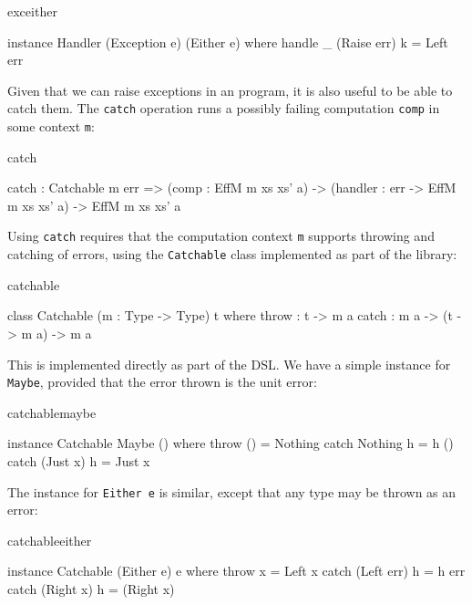 \begin{SaveVerbatim}{exceither}

instance Handler (Exception e) (Either e) where
     handle _ (Raise err) k = Left err

\end{SaveVerbatim}

\noindent
Given that we can raise exceptions in an \Eff{} program, it is also useful to be
able to catch them. The \texttt{catch} operation runs a possibly failing
computation \texttt{comp} in some context \texttt{m}:

\begin{SaveVerbatim}{catch}

catch : Catchable m err =>
        (comp : EffM m xs xs' a) -> 
        (handler : err -> EffM m xs xs' a) ->
        EffM m xs xs' a

\end{SaveVerbatim}

\noindent
Using \texttt{catch} requires that the computation context \texttt{m} supports
throwing and catching of errors, using the \texttt{Catchable} class implemented
as part of the \Idris{} library:

\begin{SaveVerbatim}{catchable}

class Catchable (m : Type -> Type) t where
    throw : t -> m a
    catch : m a -> (t -> m a) -> m a

\end{SaveVerbatim}

\noindent
This is implemented directly as part of the \Eff{} DSL.
We have a simple instance for \texttt{Maybe}, provided that
the error thrown is the unit error:

\begin{SaveVerbatim}{catchablemaybe}

instance Catchable Maybe () where
    throw () = Nothing
    catch Nothing  h = h ()
    catch (Just x) h = Just x

\end{SaveVerbatim}

\noindent
The instance for \texttt{Either e} is similar, except that any type may be
thrown as an error:

\begin{SaveVerbatim}{catchableeither}

instance Catchable (Either e) e where
    throw x = Left x
    catch (Left err) h = h err
    catch (Right x)  h = (Right x)

\end{SaveVerbatim}

